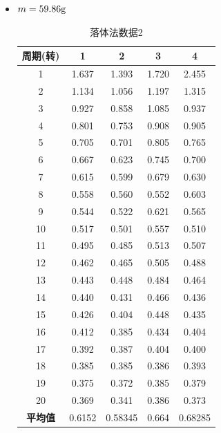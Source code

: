 \documentclass[12pt,hyperref,a4paper,UTF8]{ctexart}
\begin{document}
\begin{itemize}
            \item $m=59.86\text g$
                \begin{table}[H]
                    \centering
                    \begin{tabular}{ccccc}
                    \toprule
                    \textbf{周期(转)} & \textbf{1} & \textbf{2} & \textbf{3} & \textbf{4} \\
                    \midrule
                    1  & 1.637 & 1.393 & 1.720 & 2.455 \\
                    2  & 1.134 & 1.056 & 1.197 & 1.315 \\
                    3  & 0.927 & 0.858 & 1.085 & 0.937 \\
                    4  & 0.801 & 0.753 & 0.908 & 0.905 \\
                    5  & 0.705 & 0.701 & 0.805 & 0.765 \\
                    6  & 0.667 & 0.623 & 0.745 & 0.700 \\
                    7  & 0.615 & 0.599 & 0.679 & 0.630 \\
                    8  & 0.558 & 0.560 & 0.552 & 0.603 \\
                    9  & 0.544 & 0.522 & 0.621 & 0.565 \\
                    10 & 0.517 & 0.501 & 0.557 & 0.510 \\
                    11 & 0.495 & 0.485 & 0.513 & 0.507 \\
                    12 & 0.462 & 0.465 & 0.505 & 0.488 \\
                    13 & 0.443 & 0.448 & 0.484 & 0.464 \\
                    14 & 0.440 & 0.431 & 0.466 & 0.436 \\
                    15 & 0.426 & 0.404 & 0.448 & 0.435 \\
                    16 & 0.412 & 0.385 & 0.434 & 0.404 \\
                    17 & 0.392 & 0.387 & 0.404 & 0.400 \\
                    18 & 0.385 & 0.385 & 0.386 & 0.393 \\
                    19 & 0.375 & 0.372 & 0.385 & 0.379 \\
                    20 & 0.369 & 0.341 & 0.386 & 0.373 \\
                    \midrule
                    \textbf{平均值} & 0.6152 & 0.58345 & 0.664 & 0.68285 \\
                    \bottomrule
                    \end{tabular}
                    \caption{落体法数据2}
                    \end{table}


\end{itemize}
\end{document}
